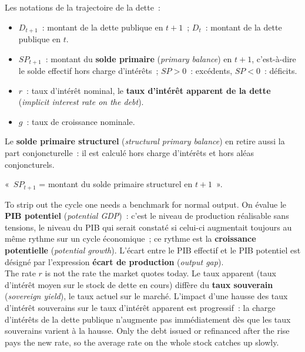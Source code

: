 \begin{notation}
  Les notations de la trajectoire de la dette~:
  \begin{itemize}
    \item $D_{t+1}$~: montant de la dette publique en $t+1$~; $D_t$~: montant
      de la dette publique en $t$.
    \item $SP_{t+1}$~: montant du \textbf{solde primaire}
      (\textit{primary balance}) en $t+1$, c'est-à-dire le solde effectif hors
      charge d'intérêts~; $SP > 0$~: excédents, $SP < 0$~: déficits.
    \item $r$~: taux d'intérêt nominal, le \textbf{taux d'intérêt apparent de la
      dette} (\textit{implicit interest rate on the debt}).
    \item $g$~: taux de croissance nominale.
  \end{itemize}
\end{notation}

Le \textbf{solde primaire structurel} (\textit{structural primary balance}) en
retire aussi la part conjoncturelle~: il est calculé hors charge d'intérêts et
hors aléas conjoncturels.

\begin{remark}
  «~$SP_{t+1}$ = montant du solde primaire structurel en $t+1$~».
\end{remark}

To strip out the cycle one needs a benchmark for normal output. On évalue le
\textbf{PIB potentiel} (\textit{potential GDP})~: c'est le niveau de production
réalisable sans tensions, le niveau du PIB qui serait constaté si celui-ci
augmentait toujours au même rythme sur un cycle économique~; ce rythme est la
\textbf{croissance potentielle} (\textit{potential growth}). L'écart entre le PIB
effectif et le PIB potentiel est désigné par l'expression
\textbf{écart de production} (\textit{output gap}).\\

The rate $r$ is not the rate the market quotes today. Le taux apparent (taux
d'intérêt moyen sur le stock de dette en cours) diffère du \textbf{taux
souverain} (\textit{sovereign yield}), le taux actuel sur le marché. L'impact
d'une hausse des taux d'intérêt souverains sur le taux d'intérêt apparent est
progressif~: la charge d'intérêts de la dette publique n'augmente pas
immédiatement dès que les taux souverains varient à la hausse. Only the debt
issued or refinanced after the rise pays the new rate, so the average rate on
the whole stock catches up slowly.

